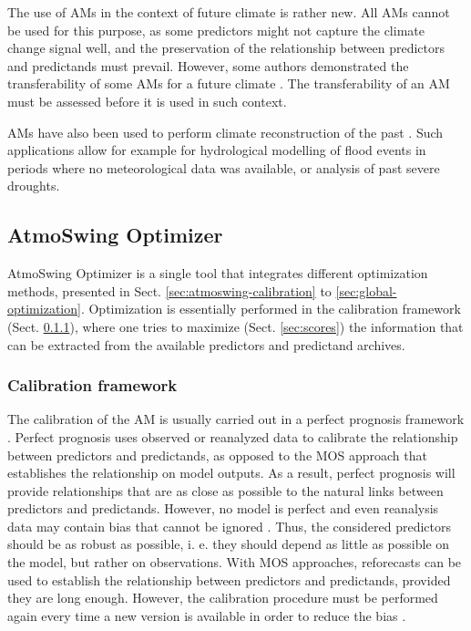 \documentclass[review]{elsarticle}
\begin{document}
The use of AMs in the context of future climate is rather new. All AMs cannot be used for this purpose, as some predictors might not capture the climate change signal well, and the preservation of the relationship between predictors and predictands must prevail. However, some authors demonstrated the transferability of some AMs for a future climate \citep{Dayon2015, Dayon2018, Raynaud2016, Turco2017}. The transferability of an AM must be assessed before it is used in such context. 

AMs have also been used to perform climate reconstruction of the past \citep{Caillouet2016, Caillouet2017, Bonnet2017}. Such applications allow for example for hydrological modelling of flood events in periods where no meteorological data was available, or analysis of past severe droughts.


\subsection{AtmoSwing Optimizer}
\label{sec:optimizer}

AtmoSwing Optimizer is a single tool that integrates different optimization methods, presented in Sect. \ref{sec:atmoswing-calibration} to \ref{sec:global-optimization}. Optimization is essentially performed in the calibration framework (Sect. \ref{sec:calibration-framework}), where one tries to maximize (Sect. \ref{sec:scores}) the information that can be extracted from the available predictors and predictand archives.


\subsubsection{Calibration framework}
\label{sec:calibration-framework}

The calibration of the AM is usually carried out in a perfect prognosis \citep{Klein1959} framework \citep{Bontron2004, BenDaoud2010}. Perfect prognosis uses observed or reanalyzed data to calibrate the relationship between predictors and predictands, as opposed to the MOS approach that establishes the relationship on model outputs. As a result, perfect prognosis will provide relationships that are as close as possible to the natural links between predictors and predictands. However, no model is perfect and even reanalysis data may contain bias that cannot be ignored \citep{Dayon2015, Horton2018b}. Thus, the considered predictors should be as robust as possible, i. e. they should depend as little as possible on the model, but rather on observations. With MOS approaches, reforecasts can be used to establish the relationship between predictors and predictands, provided they are long enough. However, the calibration procedure must be performed again every time a new version is available in order to reduce the bias \citep{Wilson2002}.
\end{document}
